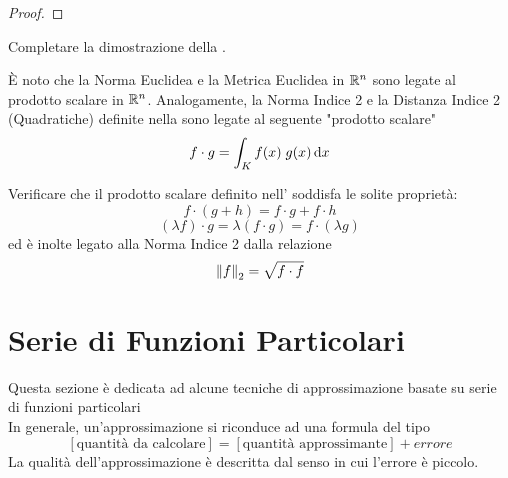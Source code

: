 \begin{proposition}
\begin{proof}
	\end{proof}
\end{proposition}
\begin{exercise}
	Completare la dimostrazione della .
\end{exercise}
\begin{observation}
	\label{obs:prod_scal_dist_quadr}
	È noto che la Norma Euclidea e la Metrica Euclidea in $\mathbb{R}^n$ sono legate al prodotto scalare in $\mathbb{R}^n$. Analogamente, la Norma Indice 2 e la Distanza Indice 2 (Quadratiche) definite nella  sono legate al seguente "prodotto scalare"
	\[f \cdot g = \int_{K} f(x) \; g(x) \,\mathrm{d}{x}\]
\end{observation}
\begin{exercise}
	Verificare che il prodotto scalare definito nell' soddisfa le solite proprietà:
	\[f \cdot (g + h) = f \cdot g + f \cdot h\]
	\[(\lambda f) \cdot g = \lambda (f \cdot g) = f \cdot (\lambda g)\]
	ed è inolte legato alla Norma Indice 2 dalla relazione
	\[\left\|f\right\|_2 = \sqrt{f \cdot f}\]
\end{exercise}

\newpage
\section{Serie di Funzioni Particolari}\label{sect:ser_funz_particol}
Questa sezione è dedicata ad alcune tecniche di approssimazione  basate su serie di funzioni particolari\\
In generale, un'approssimazione si riconduce ad una formula del tipo
\[\left[\text{quantità da calcolare}\right]=\left[\text{quantità approssimante}\right]+ errore\]
La qualità dell'approssimazione è descritta dal senso in cui l'errore è piccolo.
